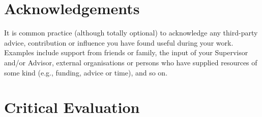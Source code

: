 \documentclass[ %
                    author={Lucas O'Dowd-Jones},
                supervisor={Dr. Alex Kavvos},
                    degree={MEng},
                     title={Variations on Normalisation by Evaluation in Haskell},
                  subtitle={},
                      type={programming languages},
                      year={2021}]{dissertation}
\begin{document}

\chapter*{Acknowledgements}


\noindent
It is common practice (although totally optional) to acknowledge any
third-party advice, contribution or influence you have found useful
during your work.  Examples include support from friends or family, 
the input of your Supervisor and/or Advisor, external organisations 
or persons who  have supplied resources of some kind (e.g., funding, 
advice or time), and so on.


%

\mainmatter














\chapter{Critical Evaluation}
\label{chap:evaluation}
\end{document}
